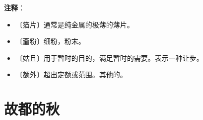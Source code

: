 \documentclass[12pt,UTF-8,openany]{ctexbook}
\begin{document}
\newpage

\textbf{注释}：

\vspace{-1em}

\begin{itemize}
    \setlength\itemsep{-0.2em}
    \item 〔箔片〕通常是纯金属的极薄的薄片。
    \item 〔齑粉〕细粉，粉末。
    \item 〔姑且〕用于暂时的目的，满足暂时的需要。表示一种让步。
    \item 〔额外〕超出定额或范围。其他的。
\end{itemize}

\chapter{故都的秋}
\end{document}
